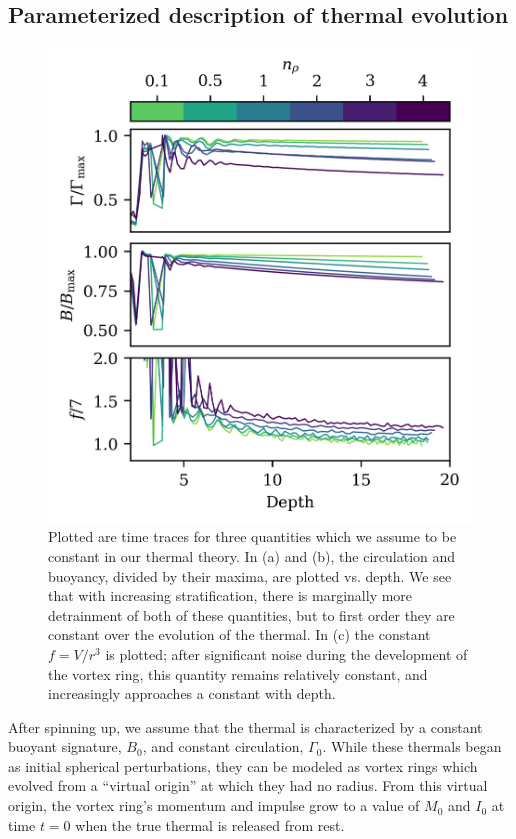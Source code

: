 \documentclass[twocolumn, amsmath, amsfonts, amssymb, trackchanges]{aastex62}
\begin{document}
\subsection{Parameterized description of thermal evolution}
\begin{figure}[t!]
    \includegraphics[width=\columnwidth]{constants.png}
    \caption{
	Plotted are time traces for three quantities which we assume to be constant in our thermal theory. 
	In (a) and (b), the circulation and buoyancy, divided by their maxima, are plotted vs. depth. 
	We see that with increasing stratification, there is marginally more detrainment of both of these quantities, but to first order they are constant over the	evolution of the thermal. 
	In (c) the constant $f = V/r^3$ is plotted; after significant noise during the development of the vortex ring, this quantity remains relatively constant, and increasingly approaches a constant with depth.
    \label{fig:constants} }
\end{figure}

After spinning up, we assume that the thermal is characterized by a constant buoyant signature, $B_0$, and constant circulation, $\Gamma_0$.
While these thermals began as initial spherical perturbations, they can be modeled as vortex rings which evolved from a ``virtual origin'' at which they had no radius. 
From this virtual origin, the vortex ring's momentum and impulse grow to a value of $M_0$ and $I_0$ at time $t = 0$ when the true thermal is released from rest.
\end{document}
